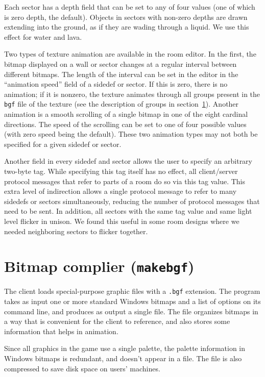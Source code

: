 Each sector has a depth field that can be set to any of four values
(one of which is zero depth, the default).  Objects in sectors with
non-zero depths are drawn extending into the ground, as if they are
wading through a liquid.  We use this effect for water and lava.

Two types of texture animation are available in the room editor.  In
the first, the bitmap displayed on a wall or sector changes at a
regular interval between different bitmaps.  The length of the
interval can be set in the editor in the ``animation speed'' field of
a sidedef or sector.  If this is zero, there is no animation; if it is
nonzero, the texture animates through all groups present in the {\tt
bgf} file of the texture (see the description of groups in
section~\ref{sec:makebgf}).  Another animation is a smooth scrolling
of a single bitmap in one of the eight cardinal directions.  The speed
of the scrolling can be set to one of four possible values (with zero
speed being the default).  These two animation types may not both be
specified for a given sidedef or sector.

Another field in every sidedef and sector allows the user to specify
an arbitrary two-byte tag.  While specifying this tag itself has no
effect, all client/server protocol messages that refer to parts of a
room do so via this tag value.  This extra level of indirection allows
a single protocol message to refer to many sidedefs or sectors
simultaneously, reducing the number of protocol messages that need to
be sent.  In addition, all sectors with the same tag value and same
light level flicker in unison.  We found this useful in some room
designs where we needed neighboring sectors to flicker together.

\section{Bitmap complier ({\tt makebgf})}
\label{sec:makebgf}

The client loads special-purpose graphic files with a {\tt .bgf}
extension.  The \makebgf program takes as input one or more standard
Windows bitmaps and a list of options on its command line, and
produces as output a single \bgf file.  The \bgf file organizes
bitmaps in a way that is convenient for the client to reference, and
also stores some information that helps in animation.

Since all graphics in the game use a single palette, the palette
information in Windows bitmaps is redundant, and doesn't appear in a
\bgf file.  The \bgf file is also compressed to save disk space on
users' machines.

